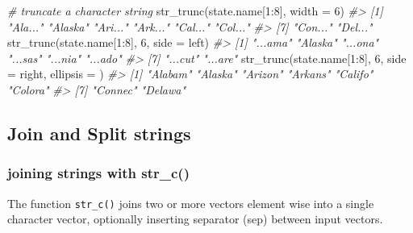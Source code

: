 \documentclass[
]{book}
\newenvironment{Shaded}{\begin{snugshade}}{\end{snugshade}}
\newcommand{\AttributeTok}[1]{\textcolor[rgb]{0.77,0.63,0.00}{#1}}
\newcommand{\CommentTok}[1]{\textcolor[rgb]{0.56,0.35,0.01}{\textit{#1}}}
\newcommand{\DecValTok}[1]{\textcolor[rgb]{0.00,0.00,0.81}{#1}}
\newcommand{\FunctionTok}[1]{\textcolor[rgb]{0.00,0.00,0.00}{#1}}
\newcommand{\NormalTok}[1]{#1}
\newcommand{\SpecialCharTok}[1]{\textcolor[rgb]{0.00,0.00,0.00}{#1}}
\newcommand{\StringTok}[1]{\textcolor[rgb]{0.31,0.60,0.02}{#1}}
\begin{document}
\begin{Shaded}
\begin{Highlighting}[]
\CommentTok{\# truncate a character string}
\FunctionTok{str\_trunc}\NormalTok{(state.name[}\DecValTok{1}\SpecialCharTok{:}\DecValTok{8}\NormalTok{], }\AttributeTok{width =} \DecValTok{6}\NormalTok{)}
\CommentTok{\#\textgreater{} [1] "Ala..." "Alaska" "Ari..." "Ark..." "Cal..." "Col..."}
\CommentTok{\#\textgreater{} [7] "Con..." "Del..."}
\FunctionTok{str\_trunc}\NormalTok{(state.name[}\DecValTok{1}\SpecialCharTok{:}\DecValTok{8}\NormalTok{], }\DecValTok{6}\NormalTok{, }\AttributeTok{side  =} \StringTok{\textquotesingle{}left\textquotesingle{}}\NormalTok{)}
\CommentTok{\#\textgreater{} [1] "...ama" "Alaska" "...ona" "...sas" "...nia" "...ado"}
\CommentTok{\#\textgreater{} [7] "...cut" "...are"}
\FunctionTok{str\_trunc}\NormalTok{(state.name[}\DecValTok{1}\SpecialCharTok{:}\DecValTok{8}\NormalTok{], }\DecValTok{6}\NormalTok{, }\AttributeTok{side  =} \StringTok{\textquotesingle{}right\textquotesingle{}}\NormalTok{, }\AttributeTok{ellipsis =} \StringTok{\textquotesingle{}\textquotesingle{}}\NormalTok{)}
\CommentTok{\#\textgreater{} [1] "Alabam" "Alaska" "Arizon" "Arkans" "Califo" "Colora"}
\CommentTok{\#\textgreater{} [7] "Connec" "Delawa"}
\end{Highlighting}
\end{Shaded}

\hypertarget{join-and-split-strings-1}{%
\subsection{Join and Split strings}\label{join-and-split-strings-1}}

\hypertarget{joining-strings-with-str_c}{%
\subsubsection{joining strings with str\_c()}\label{joining-strings-with-str_c}}

The function \texttt{str\_c()} joins two or more vectors element wise into a single character vector, optionally inserting separator (sep) between input vectors.
\end{document}
